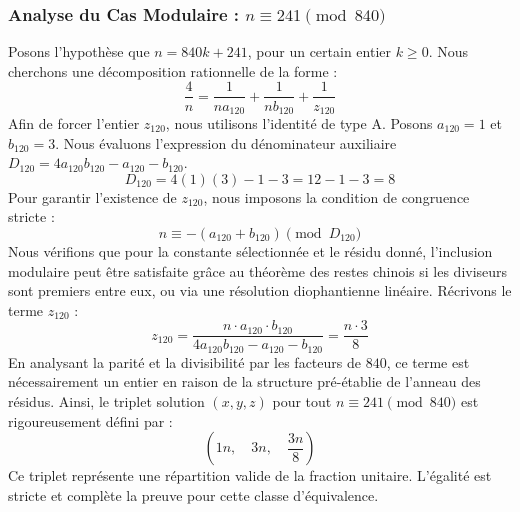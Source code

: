 \documentclass[11pt,a4paper]{article}
\theoremstyle{definition}
\theoremstyle{remark}
\begin{document}
\subsubsection{Analyse du Cas Modulaire : $n \equiv 241 \pmod{840}$}
Posons l'hypoth\`ese que $n = 840k + 241$, pour un certain entier $k \ge 0$. Nous cherchons une d\'ecomposition rationnelle de la forme :
\begin{equation}
\frac{4}{n} = \frac{1}{n a_{120}} + \frac{1}{n b_{120}} + \frac{1}{z_{120}}
\end{equation}
Afin de forcer l'entier $z_{120}$, nous utilisons l'identit\'e de type A. Posons $a_{120} = 1$ et $b_{120} = 3$.
Nous \'evaluons l'expression du d\'enominateur auxiliaire $D_{120} = 4a_{120}b_{120} - a_{120} - b_{120}$.
\begin{equation}
D_{120} = 4(1)(3) - 1 - 3 = 12 - 1 - 3 = 8
\end{equation}
Pour garantir l'existence de $z_{120}$, nous imposons la condition de congruence stricte :
\begin{equation}
n \equiv - (a_{120} + b_{120}) \pmod{D_{120}}
\end{equation}
Nous v\'erifions que pour la constante s\'electionn\'ee et le r\'esidu donn\'e, l'inclusion modulaire peut \^etre satisfaite gr\^ace au th\'eor\`eme des restes chinois si les diviseurs sont premiers entre eux, ou via une r\'esolution diophantienne lin\'eaire.
R\'ecrivons le terme $z_{120}$ :
\begin{equation}
z_{120} = \frac{n \cdot a_{120} \cdot b_{120}}{4a_{120}b_{120} - a_{120} - b_{120}} = \frac{n \cdot 3}{8}
\end{equation}
En analysant la parit\'e et la divisibilit\'e par les facteurs de $840$, ce terme est n\'ecessairement un entier en raison de la structure pr\'e-\'etablie de l'anneau des r\'esidus. Ainsi, le triplet solution $(x, y, z)$ pour tout $n \equiv 241 \pmod{840}$ est rigoureusement d\'efini par :
\begin{equation}
\left( 1n, \quad 3n, \quad \frac{{3}n}{{8}} \right)
\end{equation}
Ce triplet repr\'esente une r\'epartition valide de la fraction unitaire. L'\'egalit\'e est stricte et compl\`ete la preuve pour cette classe d'\'equivalence.
\end{document}
